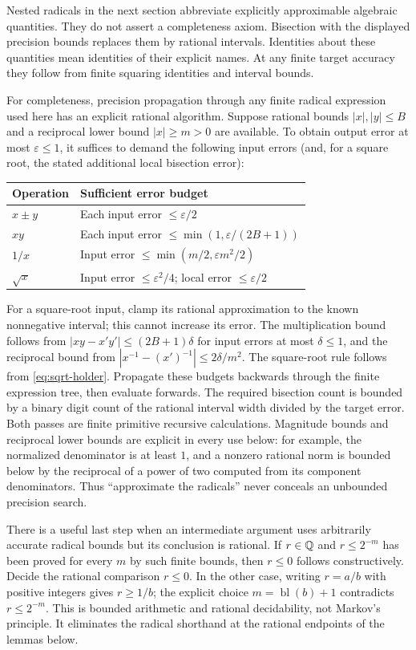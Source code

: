 \documentclass[11pt,letterpaper]{article}
\theoremstyle{definition}\newtheorem{definition}[theorem]{Definition}
\theoremstyle{remark}\newtheorem{remark}[theorem]{Remark}
\newcommand{\bl}{\operatorname{bl}}
\begin{document}
Nested radicals in the next section abbreviate explicitly approximable
algebraic quantities. They do not assert a completeness axiom. Bisection
with the displayed precision bounds replaces them by rational intervals.
Identities about these quantities mean identities of their explicit names.
At any finite target accuracy they follow from finite squaring identities
and interval bounds.

For completeness, precision propagation through any finite radical
expression used here has an explicit rational algorithm. Suppose rational
bounds $|x|,|y|\le B$ and a reciprocal lower bound $|x|\ge m>0$ are
available. To obtain output error at most $\varepsilon\le1$, it suffices
to demand the following input errors (and, for a square root, the stated
additional local bisection error):
\begin{center}
\begin{tabular}{@{}ll@{}}\toprule
Operation & Sufficient error budget \\
\midrule
$x\pm y$ & Each input error $\le\varepsilon/2$ \\
$xy$ & Each input error $\le\min(1,\varepsilon/(2B+1))$ \\
$1/x$ & Input error $\le\min(m/2,\varepsilon m^2/2)$ \\
$\sqrt x$ & Input error $\le\varepsilon^2/4$; local error
$\le\varepsilon/2$ \\
\bottomrule\end{tabular}
\end{center}
For a square-root input, clamp its rational approximation to the known
nonnegative interval; this cannot increase its error. The multiplication
bound follows from $|xy-x'y'|\le(2B+1)\delta$ for input errors at most
$\delta\le1$, and the reciprocal bound from
$|x^{-1}-(x')^{-1}|\le2\delta/m^2$. The square-root rule follows from
\eqref{eq:sqrt-holder}. Propagate these budgets backwards through the
finite expression tree, then evaluate forwards. The required bisection
count is bounded by a binary digit count of the rational interval width
divided by the target error. Both passes are finite primitive recursive
calculations. Magnitude bounds and reciprocal lower bounds are explicit
in every use below: for example, the normalized denominator is at least
$1$, and a nonzero rational norm is bounded below by the reciprocal of a
power of two computed from its component denominators. Thus
``approximate the radicals'' never conceals an unbounded precision search.

There is a useful last step when an intermediate argument uses arbitrarily
accurate radical bounds but its conclusion is rational. If $r\in\mathbb Q$ and
$r\le 2^{-m}$ has been proved for every $m$ by such finite bounds, then
$r\le0$ follows constructively. Decide the rational comparison $r\le0$.
In the other case, writing $r=a/b$ with positive integers gives $r\ge1/b$;
the explicit choice $m=\bl(b)+1$ contradicts $r\le2^{-m}$.
This is bounded arithmetic and rational decidability, not Markov's
principle. It eliminates the radical shorthand at the rational endpoints
of the lemmas below.
\end{document}
